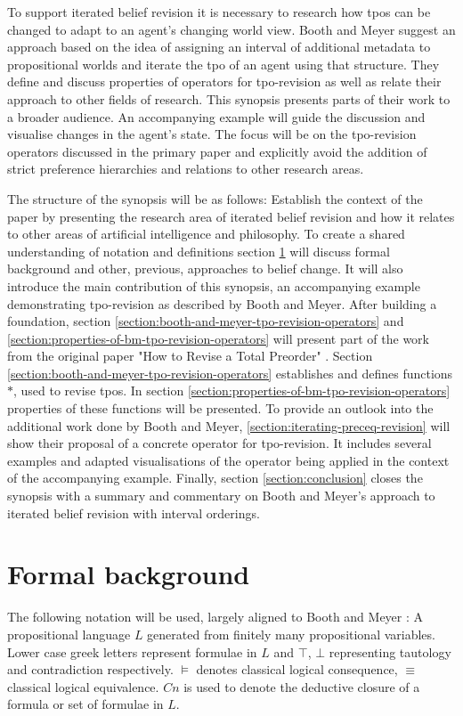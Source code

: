 \documentclass[english, 12pt]{scrartcl}
\theoremstyle{definition}
\theoremstyle{definition}
\theoremstyle{definition}
\begin{document}
To support iterated belief revision it is necessary to research how tpos can be changed to adapt to an agent's changing world view.
Booth and Meyer suggest an approach based on the idea of assigning an interval of additional metadata to propositional worlds and iterate the tpo of an agent using that structure. They define and discuss properties of operators for tpo-revision as well as relate their approach to other fields of research.
This synopsis presents parts of their work to a broader audience. An accompanying example will guide the discussion and visualise changes in the agent's state. The focus will be on the tpo-revision operators discussed in the primary paper and explicitly avoid the addition of strict preference hierarchies and relations to other research areas.

The structure of the synopsis will be as follows: Establish the context of the paper by presenting the research area of iterated belief revision and how it relates to other areas of artificial intelligence and philosophy. To create a shared understanding of notation and definitions section \ref{section:formal-background} will discuss formal background and other, previous, approaches to belief change. It will also introduce the main contribution of this synopsis, an accompanying example demonstrating tpo-revision as described by Booth and Meyer. After building a foundation, section \ref{section:booth-and-meyer-tpo-revision-operators} and \ref{section:properties-of-bm-tpo-revision-operators} will present part of the work from the original paper "How to Revise a Total Preorder" \cite{Booth2011}. Section \ref{section:booth-and-meyer-tpo-revision-operators} establishes and defines functions $\ast$, used to revise tpos. In section \ref{section:properties-of-bm-tpo-revision-operators} properties of these functions will be presented. To provide an outlook into the additional work done by Booth and Meyer, \ref{section:iterating-preceq-revision} will show their proposal of a concrete operator for tpo-revision. It includes several examples and adapted visualisations of the operator being applied in the context of the accompanying example. Finally, section \ref{section:conclusion} closes the synopsis with a summary and commentary on Booth and Meyer's approach to iterated belief revision with interval orderings.

\section{Formal background}
\label{section:formal-background}
The following notation will be used, largely aligned to Booth and Meyer \cite{Booth2011}: A propositional language $L$ generated from finitely many propositional variables. Lower case greek letters represent formulae in $L$ and $\top$, $\bot$ representing tautology and contradiction respectively. $\models$ denotes classical logical consequence, $\equiv$ classical logical equivalence. $Cn$ is used to denote the deductive closure of a formula or set of formulae in $L$.
\end{document}
